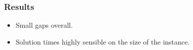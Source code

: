 \begin{frame}
\frametitle{\textbf{Results}}

  \begin{itemize}[<+->]
    \item Small gaps overall.
    \item Solution times highly sensible on the size of the instance.
  \end{itemize}
  
\end{frame}

